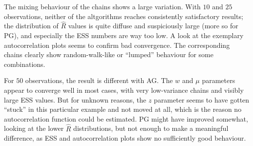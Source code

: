 The mixing behaviour of the chains shows a large variation.  With \(10\) and \(25\) observations,
neither of the altgorithms reaches consistently satisfactory results; the distribution of
\(\widehat{R}\) values is quite diffuse and suspiciously large (more so for PG), and especially the
ESS numbers are way too low.  A look at the exemplary autocorrelation plots seems to confirm bad
convergence.  The corresponding chains clearly show random-walk-like or \enquote{lumped} behaviour
for some combinations.

For \(50\) observations, the result is different with AG.  The \(w\) and \(\mu\) parameters appear
to converge well in most cases, with very low-variance chains and visibly large ESS values.  But for
unknown reasons, the \(z\) parameter seems to have gotten \enquote{stuck} in this particular example
and not moved at all, which is the reason no autocorrelation function could be estimated.  PG might
have improved somewhat, looking at the lower \(\widehat{R}\) distributions, but not enough to make a
meaningful difference, as ESS and autocorrelation plots show no sufficiently good behaviour.


\cleartorecto
\FloatBlock

